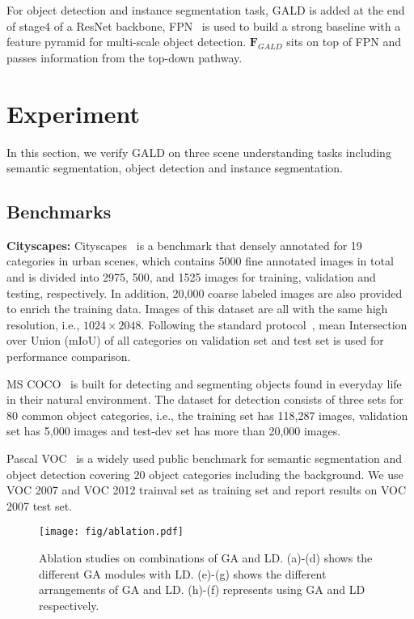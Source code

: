 \documentclass{bmvc2k}
\begin{document}
For object detection and instance segmentation task, GALD is added at the end of stage4 of a ResNet backbone, FPN~\cite{fpn} is used to build a strong baseline with a feature pyramid for multi-scale object detection. $\mathbf{F}_{GALD}$ sits on top of FPN and passes information from the top-down pathway.

 \section{Experiment}
In this section, we verify GALD on three scene understanding tasks including semantic segmentation, object detection and instance segmentation. 



\subsection{Benchmarks} 
\textbf{Cityscapes:} Cityscapes~\cite{Cityscapes} is a benchmark that densely annotated for 19 categories in urban scenes, which contains 5000 fine annotated images in total and is divided into 2975, 500, and 1525 images for training, validation and testing, respectively. In addition, 20,000 coarse labeled images are also provided to enrich the training data. Images of this dataset are all with the same high resolution, i.e., $1024 \times 2048$. Following the standard protocol~\cite{Cityscapes}, mean Intersection over Union (mIoU) of all categories on validation set and test set is used for performance comparison. 

 MS COCO~\cite{COCO_dataset} is built for detecting and segmenting objects found in everyday life in their natural environment. The dataset for detection consists of three sets for 80 common object categories, i.e., the training set has 118,287 images, validation set has 5,000 images and test-dev set has more than 20,000 images.

 Pascal VOC~\cite{VOC} is a widely used public benchmark for semantic segmentation and object detection covering $20$ object categories including the background. We use VOC 2007 and VOC 2012 trainval set as training set and report results on VOC 2007 test set. 

\begin{figure*}
\centering
\texttt{[image: fig/ablation.pdf]}
\caption{Ablation studies on combinations of GA and LD. (a)-(d) shows the different GA modules with LD. (e)-(g) shows the different arrangements of GA and LD. (h)-(f) represents using GA and LD respectively.
}
\label{fig:ablation}
\end{figure*}
\end{document}
